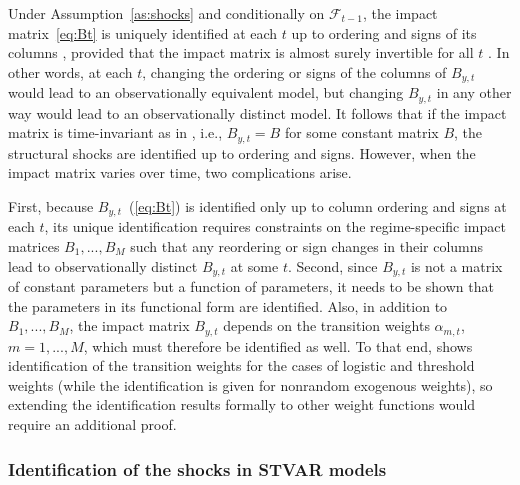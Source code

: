 \documentclass[nojss]{jss}
\begin{document}
Under Assumption~\ref{as:shocks} and conditionally on $\mathcal{F}_{t-1}$, the impact matrix~\eqref{eq:Bt} is uniquely identified at each $t$ up to ordering and signs of its columns \citep[Lemma~2]{Virolainen2:2024}, provided that the impact matrix is almost surely invertible for all $t$ \citep[Condition~1 of][]{Virolainen2:2024}. In other words, at each $t$‚ changing the ordering or signs of the columns of $B_{y,t}$ would lead to an observationally equivalent model, but changing $B_{y,t}$ in any other way would lead to an observationally distinct model. It follows that if the impact matrix is time-invariant as in \cite{Lanne+Meitz+Saikkonen:2017}, i.e., $B_{y,t}=B$ for some constant matrix $B$, the structural shocks are identified up to ordering and signs. However, when the impact matrix varies over time, two complications arise.

First, because $B_{y,t}$~(\ref{eq:Bt}) is identified only up to column ordering and signs at each $t$, its unique identification requires constraints on the regime-specific impact matrices $B_1,...,B_M$ such that any reordering or sign changes in their columns lead to observationally distinct $B_{y,t}$ at some $t$. Second, since $B_{y,t}$ is not a matrix of constant parameters but a function of parameters, it needs to be shown that the parameters in its functional form are identified. Also, in addition to $B_1,...,B_M$, the impact matrix $B_{y,t}$ depends on the transition weights $\alpha_{m,t}$, $m=1,...,M$, which must therefore be identified as well. To that end, \citet[Lemma~2 and Propositio~A.1]{Virolainen2:2024} shows identification of the transition weights for the cases of logistic and threshold weights (while the identification is given for nonrandom exogenous weights), so extending the identification results formally to other weight functions would require an additional proof.

\subsubsection{Identification of the shocks in STVAR models}\label{sec:identstvar}
\end{document}
